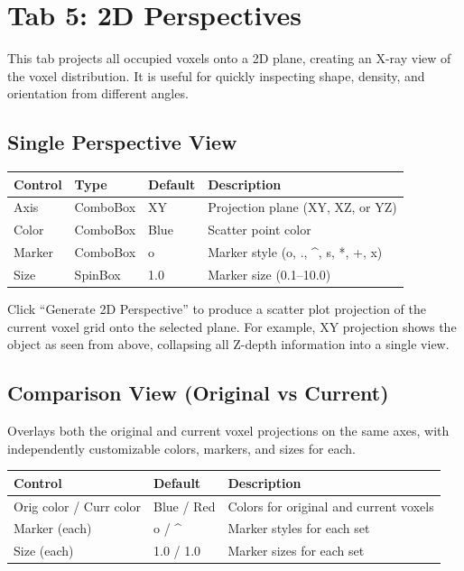 \documentclass[12pt,a4paper]{article}
\begin{document}
\section{Tab 5: 2D Perspectives}

This tab projects all occupied voxels onto a 2D plane, creating an X-ray view of the voxel distribution. It is useful for quickly inspecting shape, density, and orientation from different angles.

\subsection{Single Perspective View}

\begin{table}[H]
\centering
\begin{tabular}{lllp{7cm}}
\toprule
\textbf{Control} & \textbf{Type} & \textbf{Default} & \textbf{Description} \\
\midrule
Axis & ComboBox & XY & Projection plane (XY, XZ, or YZ) \\
Color & ComboBox & Blue & Scatter point color \\
Marker & ComboBox & o & Marker style (o, ., \^{}, s, *, +, x) \\
Size & SpinBox & 1.0 & Marker size (0.1--10.0) \\
\bottomrule
\end{tabular}
\end{table}

Click ``Generate 2D Perspective'' to produce a scatter plot projection of the current voxel grid onto the selected plane. For example, XY projection shows the object as seen from above, collapsing all Z-depth information into a single view.

\subsection{Comparison View (Original vs Current)}

Overlays both the original and current voxel projections on the same axes, with independently customizable colors, markers, and sizes for each.

\begin{table}[H]
\centering
\begin{tabular}{llp{7cm}}
\toprule
\textbf{Control} & \textbf{Default} & \textbf{Description} \\
\midrule
Orig color / Curr color & Blue / Red & Colors for original and current voxels \\
Marker (each) & o / \^{} & Marker styles for each set \\
Size (each) & 1.0 / 1.0 & Marker sizes for each set \\
\bottomrule
\end{tabular}
\end{table}
\end{document}

